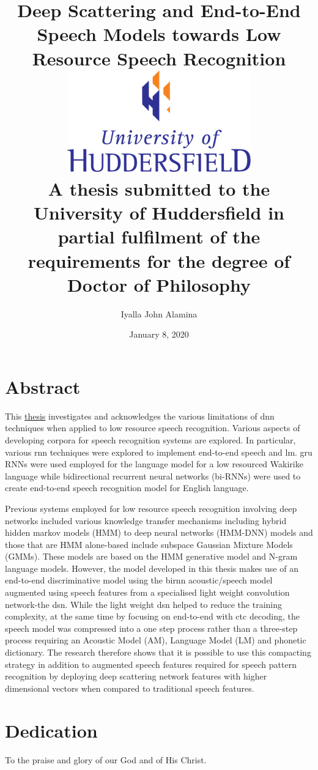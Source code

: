 \documentclass[12pt,twoside]{report}
\title{
    {Deep Scattering and End-to-End Speech Models towards Low Resource Speech Recognition}\\
    {\includegraphics{university.png}\\
A thesis submitted to the University of Huddersfield in partial fulfilment of the requirements for the degree of Doctor of Philosophy}
}
\author{Iyalla John Alamina}
\date{January 8, 2020}
\begin{document}
\makeglossaries


\maketitle
{}

\chapter*{Abstract}
This \href{https://docs.google.com/document/d/1jBp2bZf_-yWbqpSeeyGhU8uZ94o-oiHh6g_cRtjaWFQ/edit#heading=h.34qugrunyk2x}{thesis} investigates and acknowledges the various limitations of \acrfull{dnn} techniques when applied to low resource speech recognition.   Various aspects of developing corpora for speech recognition systems are explored.  In particular, various \acrfull{rnn} techniques were explored to implement end-to-end speech and \acrfull{lm}. \acrfull{gru} RNNs were used employed for the language model for a low resourced Wakirike language while bidirectional recurrent neural networks (bi-RNNs) were used to create end-to-end speech recognition model for English language.

Previous systems employed for low resource speech recognition involving deep networks included various knowledge transfer mechanisms including hybrid hidden markov models (HMM) to deep neural networks (HMM-DNN) models and those that are HMM alone-based include subspace Gaussian Mixture Models (GMMs).   These models are based on the HMM generative model and N-gram language models.  However, the model developed in this thesis makes use of an end-to-end discriminative model using the \acrshort{birnn} acoustic/speech model augmented using speech features from a specialised light weight convolution network-the \acrfull{dsn}.  While the light weight \acrshort{dsn} helped to reduce the training complexity, at the same time by focusing on end-to-end with \acrfull{ctc} decoding, the speech model was compressed into a one step process rather than a three-step process requiring an Acoustic Model (AM), Language Model (LM) and phonetic dictionary. The research therefore shows that it is possible to use this compacting strategy in addition to augmented speech features required for speech pattern recognition by deploying deep scattering network features with  higher dimensional vectors when compared to traditional speech features. 

\chapter*{Dedication}
To the praise and glory of our God and of His Christ.
\end{document}
